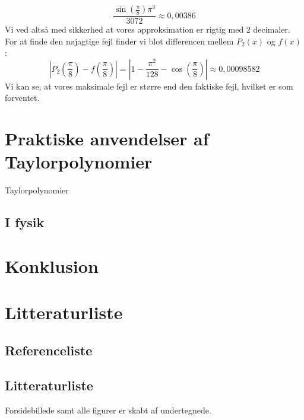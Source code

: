 \documentclass[12pt, a4paper]{article}
\begin{document}
\begin{refsection}
\begin{equation*}
    \frac{\sin\left(\frac{\pi}{8}\right)\pi^3}{3072}\approx 0{,}00386
\end{equation*}
Vi ved altså med sikkerhed at vores approksimation er rigtig med 2 decimaler.\\
For at finde den nøjagtige fejl finder vi blot differencen mellem $P_2(x)$ og $f(x)$ :
\begin{equation*}
    \left|P_2\left(\frac{\pi}{8}\right)-f\left(\frac{\pi}{8}\right)\right|=\left|1-\frac{\pi^2}{128}-\cos\left(\frac{\pi}{8} \right)   \right|\approx 0{,}00098582
\end{equation*}
Vi kan se, at vores maksimale fejl er større end den faktiske fejl, hvilket er som forventet.
\section{Praktiske anvendelser af Taylorpolynomier}
Taylorpolynomier
\subsection{I fysik}
\section{Konklusion} %
\newpage
\section{Litteraturliste}
\subsection{Referenceliste}
\printbibliography[title=Cited]
\end{refsection}
\subsection{Litteraturliste}
\nocite{*}
\printbibliography
Forsidebillede samt alle figurer er skabt af undertegnede.
\end{document}
